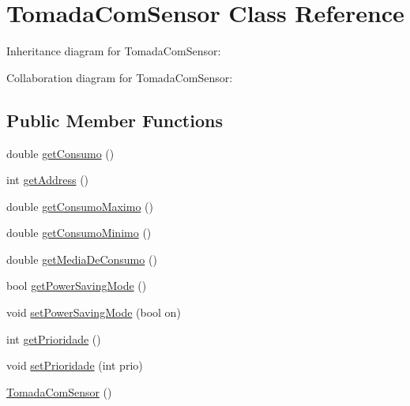 \hypertarget{class_tomada_com_sensor}{}\section{Tomada\+Com\+Sensor Class Reference}
\label{class_tomada_com_sensor}


Inheritance diagram for Tomada\+Com\+Sensor\+:


Collaboration diagram for Tomada\+Com\+Sensor\+:
\subsection*{Public Member Functions}
\begin{DoxyCompactItemize}
\item 
double \hyperlink{class_tomada_com_sensor_a86863fd1247796586fbbc9950b52dd51}{get\+Consumo} ()
\item 
int \hyperlink{class_tomada_com_sensor_a60a382cc5af2a67b7aefd2019a5245a4}{get\+Address} ()
\item 
double \hyperlink{class_tomada_com_sensor_ac59db704fdb9ba7730f353c92761765f}{get\+Consumo\+Maximo} ()
\item 
double \hyperlink{class_tomada_com_sensor_a3ee91163d518b0f4bb4284db6355e9f9}{get\+Consumo\+Minimo} ()
\item 
double \hyperlink{class_tomada_com_sensor_a96cc73a234365e58b86279fa4565996a}{get\+Media\+De\+Consumo} ()
\item 
bool \hyperlink{class_tomada_com_sensor_acc8de01f04ff3336d54807f7a6de198f}{get\+Power\+Saving\+Mode} ()
\item 
void \hyperlink{class_tomada_com_sensor_a72a42bf803f7914bb79835f57add720d}{set\+Power\+Saving\+Mode} (bool on)
\item 
int \hyperlink{class_tomada_com_sensor_afed2d87ae49747662e108643aea71978}{get\+Prioridade} ()
\item 
void \hyperlink{class_tomada_com_sensor_a05ce7d40a22649d2eba33c5154667c6a}{set\+Prioridade} (int prio)
\item 
\hyperlink{class_tomada_com_sensor_a573bfc2d00e10984b36554779b0a7bf5}{Tomada\+Com\+Sensor} ()
\end{DoxyCompactItemize}
